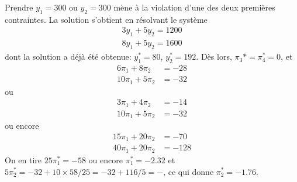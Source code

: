 \documentclass[12pt]{book}
\begin{document}
\begin{enumerate}
Prendre $y_1 = 300$ ou $y_2 = 300$ mène à la violation d'une des deux premières contraintes.
La solution s'obtient en résolvant le système
\begin{align*}
3y_1 + 5y_2 = 1200 \\
8y_1 + 5y_2 = 1600
\end{align*}
dont la solution a déjà été obtenue: $y_1^* = 80$, $y_2^* = 192$. Dès lors, $\pi_3* = \pi_4^* = 0$, et
\begin{align*}
6\pi_1 + 8\pi_2 &= -28 \\
10\pi_1 + 5\pi_2 &= -32
\end{align*}
ou
\begin{align*}
3\pi_1 + 4\pi_2 &= -14 \\
10\pi_1 + 5\pi_2 &= -32
\end{align*}
ou encore
\begin{align*}
15\pi_1 + 20\pi_2 &= -70 \\
40\pi_1 + 20\pi_2 &= -128
\end{align*}
On en tire $25\pi_1^* = -58$ ou encore $\pi_1^* = -2.32$ et $5\pi_2^* = -32+10\times 58/25 = -32+116/5 = -$,
ce qui donne $\pi_2^* = -1.76$.


\end{enumerate}
\end{document}
